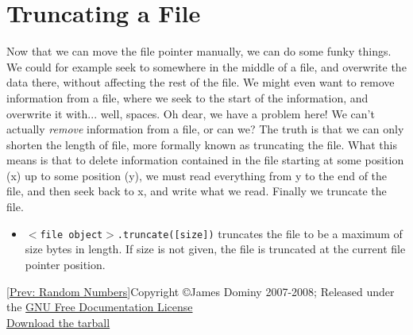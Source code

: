 \documentclass[a4paper,11pt]{article}
\begin{document}
\section{Truncating a File}

Now that we can move the file pointer manually, we can do some funky   things. We could for example seek to somewhere in the middle of a file,   and overwrite the data there, without affecting the rest of the file.   We might even want to remove information from a file, where we seek to   the start of the information, and overwrite it with... well, spaces. Oh   dear, we have a problem here! We can't actually \textit{remove}   information from a file, or can we? The truth is that we can only   shorten the length of file, more formally known as truncating the file.   What this means is that to delete information contained in the file   starting at some position (x) up to some position (y), we must read   everything from y to the end of the file, and then seek back to x, and   write what we read. Finally we truncate the file.
\begin{itemize}
	\item 
\texttt{$<$file object$>$.truncate([size])} truncates the    file to be a maximum of size bytes in length. If size is not given,    the file is truncated at the current file pointer position.
\end{itemize}    [\href{random.html}{Prev: Random Numbers}]      Copyright \copyright James Dominy 2007-2008; Released under the \href{http://www.gnu.org/copyleft/fdl.html}{GNU Free Documentation License}
\\\href{intropython.tar.gz}{Download the tarball}
\end{document}
